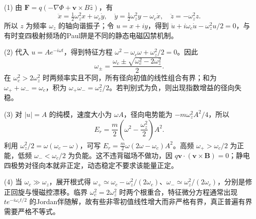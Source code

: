 (1) 由 \(\boldsymbol F=q(-\nabla\Phi+\boldsymbol v\times B\hat z)\)，有
\[
\ddot x=\tfrac12\omega_z^2x+\omega_c\dot y,\quad
\ddot y=\tfrac12\omega_z^2y-\omega_c\dot x,\quad
\ddot z=-\omega_z^2z.
\]
所以 \(z\) 为频率 \(\omega_z\) 的轴向谐振子；令 \(u=x+iy\)，得到
\(\ddot u+i\omega_c\dot u-\omega_z^2u/2=0\)，与有时变四极射频场的Paul阱是不同的静态电磁囚禁机制。

(2) 代入 \(u=Ae^{-i\omega t}\)，得到特征方程
\(\omega^2-\omega_c\omega+\omega_z^2/2=0\)。因此
\[
\boxed{\omega_\pm=\frac{\omega_c\pm\sqrt{\omega_c^2-2\omega_z^2}}2}.
\]
在 \(\omega_c^2>2\omega_z^2\) 时两频率实且不同，所有径向初值的线性组合有界；和为 \(\omega_++\omega_-=\omega_c\)，积为 \(\omega_+\omega_-=\omega_z^2/2\)。若判别式为负，则出现指数增益的径向失稳。

(3) 对 \(|u|=A\) 的纯模，速度大小为 \(\omega A\)，径向电势能为 \(-m\omega_z^2A^2/4\)，所以
\[
E_r=\frac m2\left(\omega^2-\frac{\omega_z^2}{2}\right)A^2.
\]
利用 \(\omega_z^2/2=\omega(\omega_c-\omega)\)，可写 \(E_r=\frac m2\omega(2\omega-\omega_c)A^2\)。高频 \(\omega_+>\omega_c/2\) 为正能，低频 \(\omega_-<\omega_c/2\) 为负能。这不违背磁场不做功，因 \(q\boldsymbol v\cdot(\boldsymbol v\times\boldsymbol B)=0\)；静电四极势对径向本就非正定，动态稳定不要求该能量正定。

(4) 当 \(\omega_c\gg\omega_z\)，展开根式得 \(\omega_+\simeq\omega_c-\omega_z^2/(2\omega_c)\)、\(\omega_-\simeq\omega_z^2/(2\omega_c)\)，分别是修正回旋与慢磁控漂移。临界 \(\omega_c^2=2\omega_z^2\) 时两个根重合，特征微分方程通常出现 \(t e^{-i\omega_ct/2}\) 的Jordan伴随解，故有些非零初值线性增大而非严格有界，真正普遍有界需要严格不等式。
